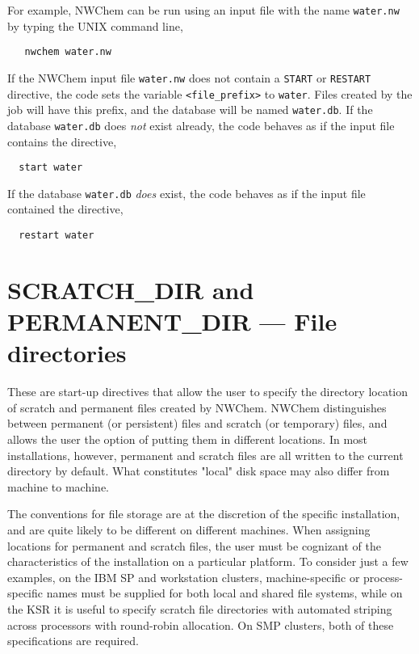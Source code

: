 For example, NWChem can be run using an input file with the name 
\verb+water.nw+ 
by typing the UNIX command line,

\begin{verbatim}
   nwchem water.nw
\end{verbatim}

If the NWChem input file \verb+water.nw+ does not contain
a \verb+START+  or \verb+RESTART+ directive, the code
sets the variable {\tt <file\_prefix>} to {\tt water}.  Files created
by the job will have this prefix, and the database will be named
{\tt water.db}.  If the database \verb+water.db+ does {\em not} exist already,
the code behaves as if the input file contains the directive,

\begin{verbatim}
  start water
\end{verbatim}

If the database \verb+water.db+ {\em does} exist,
the code behaves as if the input file contained the directive,

\begin{verbatim}
  restart water
\end{verbatim}


\section{SCRATCH\_DIR and PERMANENT\_DIR --- File directories}
\label{sec:dirs}

These are start-up directives that allow the user to specify the
directory location of scratch and permanent files created by NWChem.
NWChem distinguishes between permanent (or persistent) files and
scratch (or temporary) files, and allows the user the option of
putting them in different locations.  In most installations, however,
permanent and scratch files are all written to the current directory
by default.  What constitutes "local" disk space may also differ from 
machine to machine.

The conventions for file storage are at the discretion of the specific 
installation, and are quite likely to be different on different machines.  
When assigning locations for permanent and
scratch files,
the user must be cognizant of the characteristics of the installation
on a particular platform.
To consider just a few examples, on the IBM SP 
and workstation clusters, machine-specific or process-specific
names must be supplied for both local and shared file
systems, while on the KSR it is useful to specify scratch file directories
with automated striping across processors with round-robin allocation.
On SMP clusters, both of these specifications are required.  

